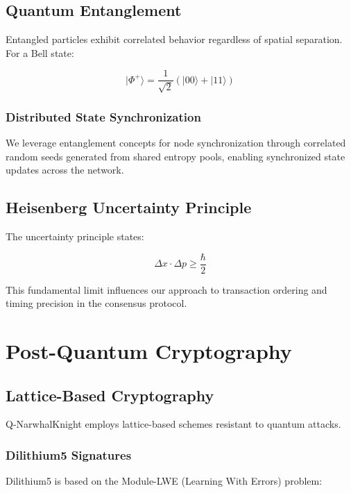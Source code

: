 \documentclass[11pt,a4paper]{article}
\begin{document}
\subsection{Quantum Entanglement}

Entangled particles exhibit correlated behavior regardless of spatial separation. For a Bell state:

\begin{equation}
|\Phi^+\rangle = \frac{1}{\sqrt{2}}(|00\rangle + |11\rangle)
\end{equation}

\subsubsection{Distributed State Synchronization}

We leverage entanglement concepts for node synchronization through correlated random seeds generated from shared entropy pools, enabling synchronized state updates across the network.

\subsection{Heisenberg Uncertainty Principle}

The uncertainty principle states:

\begin{equation}
\Delta x \cdot \Delta p \geq \frac{\hbar}{2}
\end{equation}

This fundamental limit influences our approach to transaction ordering and timing precision in the consensus protocol.

\section{Post-Quantum Cryptography}

\subsection{Lattice-Based Cryptography}

Q-NarwhalKnight employs lattice-based schemes resistant to quantum attacks.

\subsubsection{Dilithium5 Signatures}

Dilithium5 is based on the Module-LWE (Learning With Errors) problem:
\end{document}
